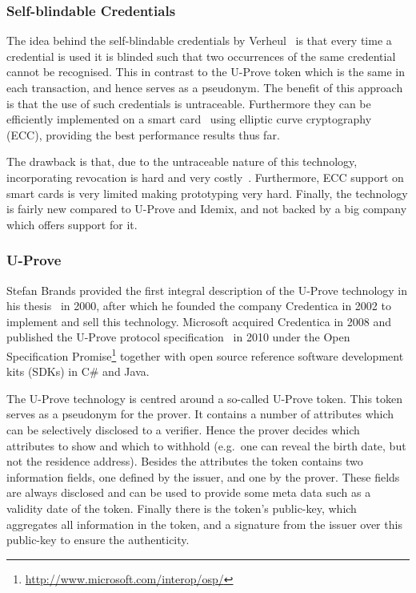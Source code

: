\subsubsection{Self-blindable Credentials}\label{sec:selfblindable}

The idea behind the self-blindable credentials by
Verheul~\cite{Verheul01} is that every time a credential is used it is
blinded such that two occurrences of the same credential cannot be
recognised. This in contrast to the U-Prove token which is the same in
each transaction, and hence serves as a pseudonym. The benefit of this
approach is that the use of such credentials is
untraceable. Furthermore they can be efficiently implemented on a
smart card~\cite{BatinaHJMV10,HoepmanJV10} using elliptic curve
cryptography (ECC), providing the best performance results thus far.

The drawback is that, due to the untraceable nature of this technology,
incorporating revocation is hard and very costly~\cite{HoepmanLV11}. %
Furthermore, ECC support on smart cards is very limited making prototyping
very hard. Finally, the technology is fairly new compared to U-Prove and
Idemix, and not backed by a big company which offers support for it.

\subsubsection{U-Prove}\label{sec:uprove}

Stefan Brands provided the first integral description of the U-Prove
technology in his thesis~\cite{Brands2000} in 2000, after which he founded
the company Credentica in 2002 to implement and sell this technology.
Microsoft acquired Credentica in 2008 and published the U-Prove protocol
specification~\cite{U-Prove_Crypto2010} in 2010 under the Open
Specification
Promise\footnote{\url{http://www.microsoft.com/interop/osp/}} together with
open source reference software development kits (SDKs) in C\# and Java.

The U-Prove technology is centred around a so-called U-Prove token. This
token serves as a pseudonym for the prover. It contains a number of
attributes which can be selectively disclosed to a verifier. Hence the
prover decides which attributes to show and which to withhold (e.g.\ one
can reveal the birth date, but not the residence address). Besides the
attributes the token contains two information fields, one defined by the
issuer, and one by the prover. These fields are always disclosed and can be
used to provide some meta data such as a validity date of the token.
Finally there is the token's public-key, which aggregates all information
in the token, and a signature from the issuer over this public-key to
ensure the authenticity.

